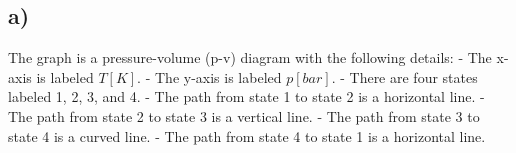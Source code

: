 

\subsection*{a)}

The graph is a pressure-volume (p-v) diagram with the following details:
- The x-axis is labeled $T [K]$.
- The y-axis is labeled $p [bar]$.
- There are four states labeled 1, 2, 3, and 4.
- The path from state 1 to state 2 is a horizontal line.
- The path from state 2 to state 3 is a vertical line.
- The path from state 3 to state 4 is a curved line.
- The path from state 4 to state 1 is a horizontal line.